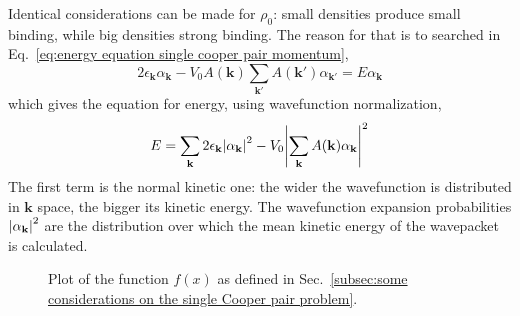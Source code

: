 Identical considerations can be made for $\rho_0$: small densities produce small binding, while big densities strong binding. The reason for that is to searched in Eq.~\eqref{eq:energy equation single cooper pair momentum},
\[
	2 \epsilon_\mathbf{k} \alpha_\mathbf{k} - V_0 A(\mathbf{k}) \sum_{\mathbf{k}'} A(\mathbf{k}') \alpha_{\mathbf{k}'} = E \alpha_\mathbf{k}
\]
which gives the equation for energy, using wavefunction normalization,
\begin{equation}\label{eq:energy equation single cooper pair probabilities}
	E = \sum_\mathbf{k} 2 \epsilon_\mathbf{k} \abs{\alpha_\mathbf{k}}^2 - V_0 \abs{\sum_\mathbf{k} A(\mathbf{k}) \alpha_\mathbf{k}}^2
\end{equation}
The first term is the normal kinetic one: the wider the wavefunction is distributed in $\mathbf{k}$ space, the bigger its kinetic energy. The wavefunction expansion probabilities $\abs{\alpha_\mathbf{k}}^2$ are the distribution over which the mean kinetic energy of the wavepacket is calculated. 

\begin{figure}
	\centering
	
	\caption{Plot of the function $f(x)$ as defined in Sec.~\ref{subsec:some considerations on the single Cooper pair problem}.}
	\label{fig:single cooper pair momentum distribution function}
\end{figure}

